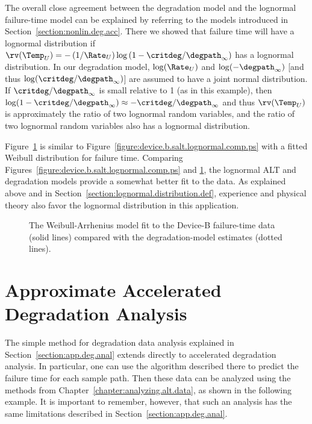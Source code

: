 The overall close agreement between the degradation model and the lognormal
failure-time model can be explained by referring to the models
introduced in Section~\ref{section:nonlin.deg.acc}.  There we
showed that failure time will have a lognormal distribution if
${\rv}(\Temp_{U})=- \, (1/\Rate_{U})\log
\left(1-\critdeg/\degpath_{\infty} \right )$
has a lognormal distribution. In our degradation model,
$\log(\Rate_{U})$ and $\log(-\degpath_{\infty})$ [and thus
$\log(\critdeg/\degpath_{\infty})$] are assumed to have a joint
normal distribution. If $\critdeg/\degpath_{\infty}$ is small
relative to 1 (as in this example), then $ \log( 1-\critdeg /
\degpath_{\infty} )
\approx -\critdeg / \degpath_{\infty} $ and thus $ \rv ( \Temp_{U} )$  is
approximately the ratio of two lognormal random variables, and the
ratio of two lognormal random variables also has a lognormal
distribution.

Figure~\ref{figure:device.b.salt.weibull.comp.ps} is similar to
Figure~\ref{figure:device.b.salt.lognormal.comp.ps} with a fitted
Weibull distribution for failure time.  Comparing
Figures~\ref{figure:device.b.salt.lognormal.comp.ps} and
\ref{figure:device.b.salt.weibull.comp.ps}, the lognormal ALT and 
degradation models provide a somewhat better fit to the data.  As
explained above and in
Section~\ref{section:lognormal.distribution.def}, experience and
physical theory also favor the lognormal distribution in this
application.

\begin{figure}
\caption{The Weibull-Arrhenius model fit to the Device-B failure-time
data (solid lines) compared with the degradation-model estimates
(dotted lines).}
\label{figure:device.b.salt.weibull.comp.ps}
\end{figure}


\section{Approximate Accelerated Degradation Analysis}
\label{section:app.acc.deg.anal}
The simple method for degradation data analysis explained in
Section~\ref{section:app.deg.anal} extends directly to accelerated
degradation analysis. In particular, one can use the algorithm
described there to predict the failure time for each sample
path. Then these data can be analyzed using the methods from
Chapter~\ref{chapter:analyzing.alt.data}, as shown in the following
example.  It is important to remember, however, that such an
analysis has the same limitations described in
Section~\ref{section:app.deg.anal}.

